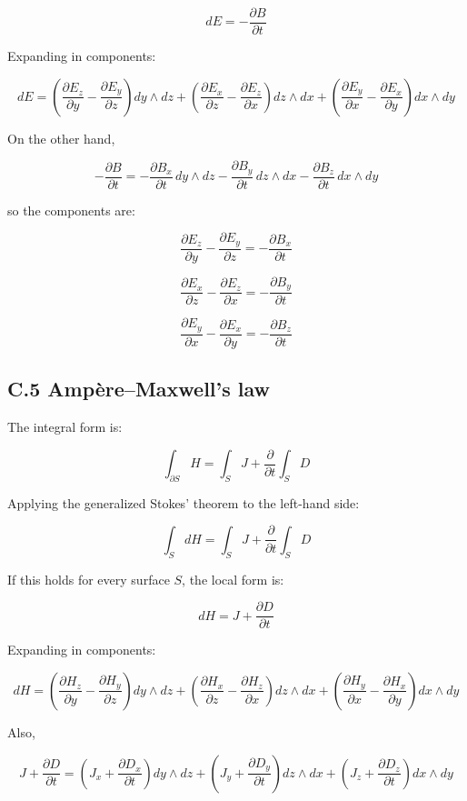 \[
dE=-\frac{\partial B}{\partial t}
\]

Expanding in components:

\[dE = \left(\frac{\partial E_z}{\partial y}-\frac{\partial E_y}{\partial z}\right)dy\wedge dz + \left(\frac{\partial E_x}{\partial z}-\frac{\partial E_z}{\partial x}\right)dz\wedge dx + \left(\frac{\partial E_y}{\partial x}-\frac{\partial E_x}{\partial y}\right)dx\wedge dy\]

On the other hand,

\[
-\frac{\partial B}{\partial t}
=
-\frac{\partial B_x}{\partial t}\,dy\wedge dz
-\frac{\partial B_y}{\partial t}\,dz\wedge dx
-\frac{\partial B_z}{\partial t}\,dx\wedge dy
\]

so the components are:

\[
\frac{\partial E_z}{\partial y}
-
\frac{\partial E_y}{\partial z}
=
-\frac{\partial B_x}{\partial t}
\]

\[
\frac{\partial E_x}{\partial z}
-
\frac{\partial E_z}{\partial x}
=
-\frac{\partial B_y}{\partial t}
\]

\[
\frac{\partial E_y}{\partial x}
-
\frac{\partial E_x}{\partial y}
=
-\frac{\partial B_z}{\partial t}
\]

\hypertarget{c.5-ampuxe8remaxwells-law}{%
\subsection{C.5 Ampère--Maxwell's law}\label{c.5-ampuxe8remaxwells-law}}

The integral form is:

\[
\int_{\partial S}H
=
\int_S J+\frac{\partial}{\partial t}\int_S D
\]

Applying the generalized Stokes' theorem to the left-hand side:

\[
\int_S dH
=
\int_S J+\frac{\partial}{\partial t}\int_S D
\]

If this holds for every surface \(S\), the local form is:

\[
dH=J+\frac{\partial D}{\partial t}
\]

Expanding in components:

\[dH = \left(\frac{\partial H_z}{\partial y}-\frac{\partial H_y}{\partial z}\right)dy\wedge dz + \left(\frac{\partial H_x}{\partial z}-\frac{\partial H_z}{\partial x}\right)dz\wedge dx + \left(\frac{\partial H_y}{\partial x}-\frac{\partial H_x}{\partial y}\right)dx\wedge dy\]

Also,

\[J+\frac{\partial D}{\partial t} = \left(J_x+\frac{\partial D_x}{\partial t}\right)dy\wedge dz + \left(J_y+\frac{\partial D_y}{\partial t}\right)dz\wedge dx + \left(J_z+\frac{\partial D_z}{\partial t}\right)dx\wedge dy\]


